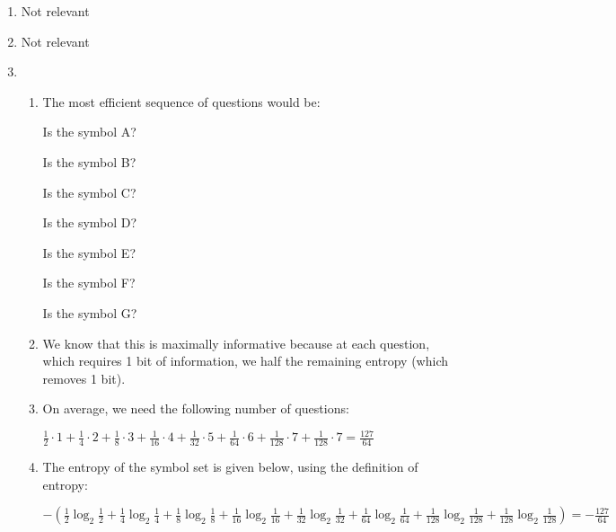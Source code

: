 


\begin{enumerate}[label=(\alph*)]
  \item
    Not relevant

    \item
      Not relevant

    \item
      \begin{enumerate}[label=(\roman*)]
        \item
        The most efficient sequence of questions would be:

        Is the symbol A?

        Is the symbol B?

        Is the symbol C?

        Is the symbol D?
        
        Is the symbol E?
        
        Is the symbol F?

        Is the symbol G?

      \item

        We know that this is maximally informative because at each question, which requires 1 bit of information, we half the remaining entropy (which removes 1 bit).

      \item
        On average, we need the following number of questions:

        $\frac{1}{2} \cdot 1 + \frac{1}{4} \cdot 2 + \frac{1}{8} \cdot 3 + \frac{1}{16} \cdot 4 + \frac{1}{32} \cdot 5 + \frac{1}{64} \cdot 6 + \frac{1}{128}\cdot 7 + \frac{1}{128} \cdot 7 = \frac{127}{64}$

      \item
        The entropy of the symbol set is given below, using the definition of entropy:

        $-(\frac{1}{2}\log_2\frac{1}{2} + \frac{1}{4}\log_2 \frac{1}{4} + \frac{1}{8} \log_2 \frac{1}{8} + \frac{1}{16}\log_2 \frac{1}{16} + \frac{1}{32}\log_2 \frac{1}{32} + \frac{1}{64} \log_2 \frac{1}{64} + \frac{1}{128} \log_2 \frac{1}{128} + \frac{1}{128} \log_2 \frac{1}{128}) = -\frac{127}{64}$



      \end{enumerate}

        
    \end{enumerate}

